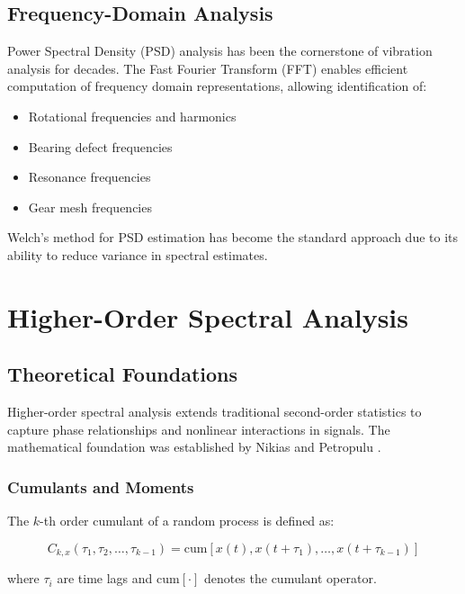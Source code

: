 \subsection{Frequency-Domain Analysis}

Power Spectral Density (PSD) analysis has been the cornerstone of vibration analysis for decades. The Fast Fourier Transform (FFT) enables efficient computation of frequency domain representations, allowing identification of:

\begin{itemize}
    \item Rotational frequencies and harmonics
    \item Bearing defect frequencies
    \item Resonance frequencies
    \item Gear mesh frequencies
\end{itemize}

Welch's method \cite{welch1967use} for PSD estimation has become the standard approach due to its ability to reduce variance in spectral estimates.

\section{Higher-Order Spectral Analysis}

\subsection{Theoretical Foundations}

Higher-order spectral analysis extends traditional second-order statistics to capture phase relationships and nonlinear interactions in signals. The mathematical foundation was established by Nikias and Petropulu \cite{nikias1993higher}.

\subsubsection{Cumulants and Moments}

The $k$-th order cumulant of a random process is defined as:

\begin{equation}
C_{k,x}(\tau_1, \tau_2, \ldots, \tau_{k-1}) = \text{cum}[x(t), x(t+\tau_1), \ldots, x(t+\tau_{k-1})]
\end{equation}

where $\tau_i$ are time lags and $\text{cum}[\cdot]$ denotes the cumulant operator.

